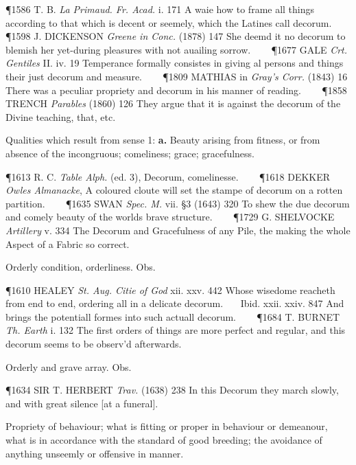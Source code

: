 \begin{description}[wide, labelwidth=!, labelindent=0pt]
\begin{myenumerate}
\P 1586 T. B. \textit{La Primaud. Fr. Acad.} i. 171 A waie how to frame all things according to that which is decent or seemely, which the Latines call decorum.    
\P 1598 J. DICKENSON  \textit{Greene in Conc.} (1878) 147 She deemd it no decorum to blemish her yet-during pleasures with not auailing sorrow.    
\P 1677 GALE  \textit{Crt. Gentiles} II. iv. 19 Temperance formally consistes in giving al persons and things their just decorum and measure.    
\P 1809 MATHIAS in  \textit{Gray's Corr.} (1843) 16 There was a peculiar propriety and decorum in his manner of reading.    
\P 1858 TRENCH  \textit{Parables} (1860) 126 They argue that it is against the decorum of the Divine teaching, that, etc.

 Qualities which result from sense 1: \textbf{a.} Beauty arising from fitness, or from absence of the incongruous; comeliness; grace; gracefulness.

\P 1613 R. C. \textit{Table  Alph.} (ed. 3), Decorum, comelinesse.    
\P 1618 DEKKER  \textit{Owles Almanacke}, A coloured cloute will set the stampe of decorum on a rotten partition.    
\P 1635 SWAN  \textit{Spec. M.} vii. §3 (1643) 320 To shew the due decorum and comely beauty of the worlds brave structure.    
\P 1729 G. SHELVOCKE  \textit{Artillery} v. 334 The Decorum and Gracefulness of any Pile, the making the whole Aspect of a Fabric so correct.

 Orderly condition, orderliness. Obs.

\P 1610 HEALEY  \textit{St. Aug. Citie of God} xii. xxv. 442 Whose wisedome reacheth from end to end, ordering all in a delicate decorum.    Ibid. xxii. xxiv. 847 And brings the potentiall formes into such actuall decorum.    
\P 1684 T. BURNET  \textit{Th. Earth} i. 132 The first orders of things are more perfect and regular, and this decorum seems to be observ'd afterwards.

 Orderly and grave array. Obs.

\P 1634 SIR T. HERBERT  \textit{Trav.} (1638) 238 In this Decorum they march slowly, and with great silence [at a funeral].

 Propriety of behaviour; what is fitting or proper in behaviour or demeanour, what is in accordance with the standard of good breeding; the avoidance of anything unseemly or offensive in manner.


\end{myenumerate}
\end{description}
